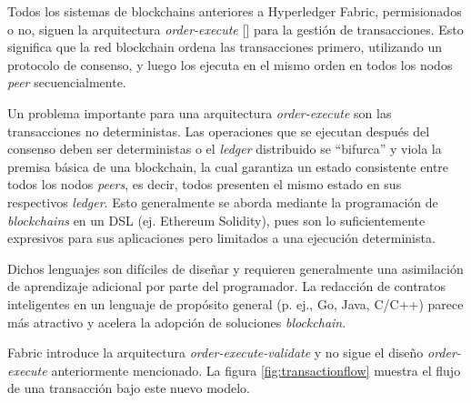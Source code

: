 
Todos los sistemas de blockchains anteriores a Hyperledger Fabric, permisionados o no, siguen la arquitectura  \textit{order-execute} [\cite{hlf-paper}] para la gestión de transacciones. Esto significa que la red blockchain ordena las transacciones primero, utilizando un protocolo de consenso, y luego los ejecuta en el mismo orden en todos los nodos \textit{peer} secuencialmente.


Un problema importante para una arquitectura \textit{order-execute} son las transacciones no deterministas. Las operaciones que se ejecutan después del consenso deben ser deterministas o el \textit{ledger} distribuido se “bifurca” y viola la premisa básica de una blockchain, la cual garantiza un estado consistente entre todos los nodos \textit{peers}, es decir, todos presenten el mismo estado en sus respectivos \textit{ledger}. Esto generalmente se aborda mediante la programación de \textit{blockchains} en un DSL (ej. Ethereum Solidity), pues son lo suficientemente expresivos para sus aplicaciones pero limitados a una ejecución determinista.

Dichos lenguajes son difíciles de diseñar y requieren generalmente una asimilación de aprendizaje adicional por parte del programador. La redacción de contratos inteligentes en un lenguaje de propósito general (p. ej., Go, Java, C/C++) parece más atractivo y acelera la adopción de soluciones \textit{blockchain}.


Fabric introduce la arquitectura \textit{order-execute-validate} y no sigue el diseño \textit{order-execute} anteriormente mencionado. La figura \ref{fig:transactionflow} muestra el flujo de una transacción bajo este nuevo modelo.\\[5cm]

